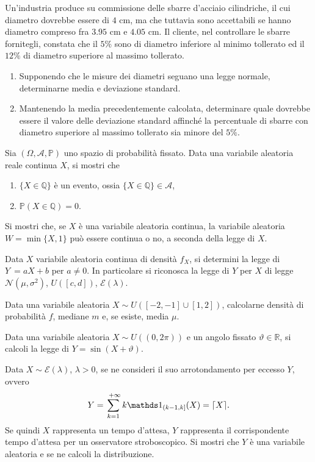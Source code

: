 Un'industria produce su commissione delle sbarre d'acciaio cilindriche, il cui diametro dovrebbe essere di $4$ cm, ma che tuttavia sono accettabili se hanno diametro compreso fra $3.95$ cm e $4.05$ cm. Il cliente, nel controllare le sbarre fornitegli, constata che il $5\%$ sono di diametro inferiore al minimo tollerato ed il $12\%$ di diametro superiore al massimo tollerato.
\begin{enumerate}
\item Supponendo che le misure dei diametri seguano una legge normale, determinarne media e deviazione standard.
\item Mantenendo la media precedentemente calcolata, determinare quale dovrebbe essere il valore delle deviazione standard affinché la percentuale di sbarre con diametro superiore al massimo tollerato sia minore del $5\%$.
\end{enumerate}
\Esercizio{}

Sia $( \Omega ,\mathcal{A} ,\mathbb{P})$ uno spazio di probabilità fissato. Data una variabile aleatoria reale continua $X$, si mostri che
\begin{enumerate}
\item $\{X\in \mathbb{Q}\}$ è un evento, ossia $\{X\in \mathbb{Q}\} \in \mathcal{A}$,
\item $\mathbb{P}( X\in \mathbb{Q}) =0$.
\end{enumerate}
\Esercizio{}

Si mostri che, se $X$ è una variabile aleatoria continua, la variabile aleatoria $W=\min\{X,1\}$ può essere continua o no, a seconda della legge di $X$.
\Esercizio{}

Data $X$ variabile aleatoria continua di densità $f_{X}$, si determini la legge di $Y\ =aX+b$ per $a\neq 0$. In particolare si riconosca la legge di $Y$ per $X$ di legge $\mathcal{N}\left( \mu ,\sigma ^{2}\right)$, $U([ c,d])$, $\mathcal{E}( \lambda )$.
\Esercizio{}

Data una variabile aleatoria $X\sim U([ -2,-1] \cup [ 1,2])$, calcolarne densità di probabilità $f$, mediane $m$ e, se esiste, media $\mu $.
\Esercizio{$\star$}

Data una variabile aleatoria $X\sim U(( 0,2\pi ))$ e un angolo fissato $\vartheta \in \mathbb{R}$, si calcoli la legge di $Y=\sin( X+\vartheta )$.
\Esercizio{}

Data $X\sim \mathcal{E}( \lambda )$, $\lambda  >0$, se ne consideri il suo arrotondamento per eccesso $Y$, ovvero
\begin{equation*}
Y=\sum\limits _{k=1}^{\ +\infty } k\Ind_{( k-1,k]}( X) =\lceil X\rceil .
\end{equation*}
Se quindi $X$ rappresenta un tempo d'attesa, $Y$ rappresenta il corrispondente tempo d'attesa per un osservatore stroboscopico. Si mostri che $Y$ è una variabile aleatoria e se ne calcoli la distribuzione.
\Esercizio{}


